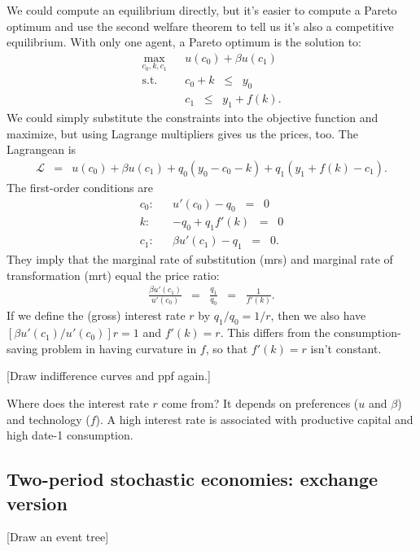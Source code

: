 \documentclass[11pt]{article}
\begin{document}
We could compute an equilibrium directly,
but it's easier to compute a Pareto optimum and
use the second welfare theorem to tell us it's also
a competitive equilibrium.
With only one agent, a Pareto optimum is the solution to:
\begin{eqnarray*}
    \max_{c_0,k,c_1} && u(c_0) + \beta u(c_1) \\
    \mbox{s.t.}   &&  c_0 + k \;\;\leq\;\; y_0 \\
                  &&  c_1 \;\;\leq\;\;  y_1 + f(k) .
\end{eqnarray*}
We could simply substitute the constraints into the objective
function and maximize, but using Lagrange multipliers gives us
the prices, too.
The Lagrangean is
\begin{eqnarray*}
    \mathcal{L} &=&  u(c_0) + \beta u(c_1) + q_0 (y_0 - c_0 - k)
                    + q_1 ( y_1 + f(k) - c_1)  .
\end{eqnarray*}
The first-order conditions are
\begin{eqnarray*}
    c_0: &&  u'(c_0) - q_0 \;\;=\;\; 0 \\
    k: &&  - q_0 + q_1 f'(k)  \;\;=\;\; 0 \\
    c_1: &&  \beta u'(c_1) - q_1 \;\;=\;\; 0 .
\end{eqnarray*}
They imply that the marginal rate of substitution (mrs)
and marginal rate of transformation (mrt)
equal the price ratio:
\begin{eqnarray*}
    \frac{\beta u'(c_1)}{u'(c_0)} &=& \frac{q_1}{q_0} \;\;=\;\; \frac{1}{f'(k)} .
\end{eqnarray*}
If we define the (gross) interest rate $r$ by $q_1/q_0 = 1/r$,
then we also have $ [\beta u'(c_1)/u'(c_0)] r = 1$ and $f'(k) = r$.
This differs from the consumption-saving problem in having curvature
in $f$, so that $f'(k) = r$ isn't constant.

[Draw indifference curves and ppf again.]

 Where does the interest rate $r$ come from?
 It depends on preferences ($u$ and $\beta$)
and technology ($f$).
A high interest rate is associated with productive capital
and high date-1 consumption.


\subsection*{Two-period stochastic economies:  exchange version}

[Draw an event tree]
\end{document}
